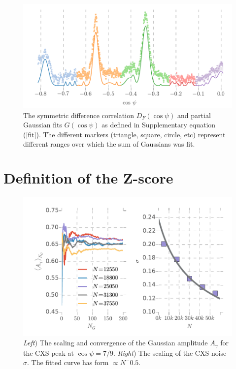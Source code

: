 \documentclass [12pt,fleqn]{article}
\begin{document}
\begin{figure}[H]
\includegraphics[scale=0.8]{supp_figs/gaussian_partial.pdf}
\caption{The symmetric difference correlation $D_F(\cos \psi)$ and partial Gaussian fits $G(\cos \psi)$ as defined in Supplementary equation (\ref{fit}). The different markers (triangle, square, circle, etc) represent different ranges over which the sum of Gaussians was fit.}
\label{fig:gaussian_partial}
\end{figure}

\section{Definition of the Z-score} \label{supp:Z}
\begin{figure}[H]
\includegraphics[]{supp_figs/scaling.pdf}
\caption{\emph{Left}) The scaling and convergence of the Gaussian amplitude $A_\gamma$ for the CXS peak at $\cos \psi = 7/9$. \emph{Right}) The scaling of the CXS noise $\sigma$. The fitted curve has form $\propto N^-0.5$.}
\label{fig:scaling}
\end{figure}
\end{document}
